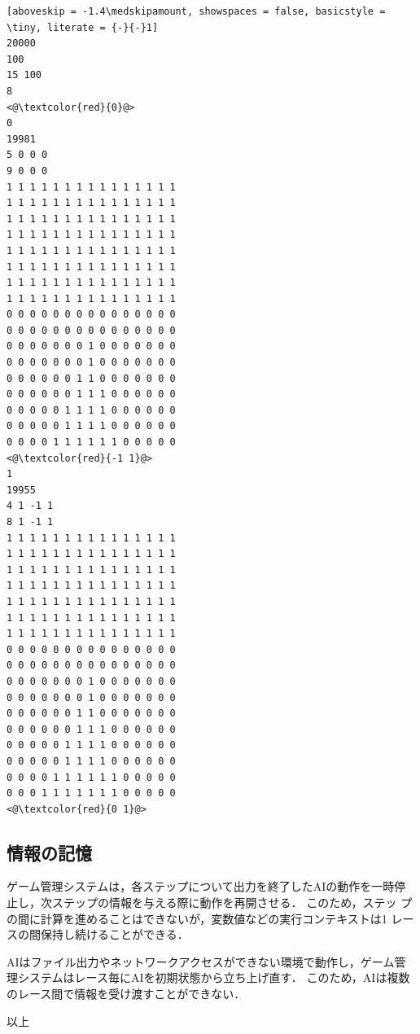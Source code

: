 \documentclass[11pt]{jarticle}
\begin{document}
\begin{minipage}[t]{.3\textwidth}
\begin{lstlisting}[aboveskip = -1.4\medskipamount, showspaces = false, basicstyle = \tiny, literate = {-}{-}1]
20000
100
15 100
8
<@\textcolor{red}{0}@>
0
19981
5 0 0 0
9 0 0 0
1 1 1 1 1 1 1 1 1 1 1 1 1 1 1
1 1 1 1 1 1 1 1 1 1 1 1 1 1 1
1 1 1 1 1 1 1 1 1 1 1 1 1 1 1
1 1 1 1 1 1 1 1 1 1 1 1 1 1 1
1 1 1 1 1 1 1 1 1 1 1 1 1 1 1
1 1 1 1 1 1 1 1 1 1 1 1 1 1 1
1 1 1 1 1 1 1 1 1 1 1 1 1 1 1
1 1 1 1 1 1 1 1 1 1 1 1 1 1 1
0 0 0 0 0 0 0 0 0 0 0 0 0 0 0
0 0 0 0 0 0 0 0 0 0 0 0 0 0 0
0 0 0 0 0 0 0 1 0 0 0 0 0 0 0
0 0 0 0 0 0 0 1 0 0 0 0 0 0 0
0 0 0 0 0 0 1 1 0 0 0 0 0 0 0
0 0 0 0 0 0 1 1 1 0 0 0 0 0 0
0 0 0 0 0 1 1 1 1 0 0 0 0 0 0
0 0 0 0 0 1 1 1 1 0 0 0 0 0 0
0 0 0 0 1 1 1 1 1 1 0 0 0 0 0
<@\textcolor{red}{-1 1}@>
1
19955
4 1 -1 1
8 1 -1 1
1 1 1 1 1 1 1 1 1 1 1 1 1 1 1
1 1 1 1 1 1 1 1 1 1 1 1 1 1 1
1 1 1 1 1 1 1 1 1 1 1 1 1 1 1
1 1 1 1 1 1 1 1 1 1 1 1 1 1 1
1 1 1 1 1 1 1 1 1 1 1 1 1 1 1
1 1 1 1 1 1 1 1 1 1 1 1 1 1 1
1 1 1 1 1 1 1 1 1 1 1 1 1 1 1
0 0 0 0 0 0 0 0 0 0 0 0 0 0 0
0 0 0 0 0 0 0 0 0 0 0 0 0 0 0
0 0 0 0 0 0 0 1 0 0 0 0 0 0 0
0 0 0 0 0 0 0 1 0 0 0 0 0 0 0
0 0 0 0 0 0 1 1 0 0 0 0 0 0 0
0 0 0 0 0 0 1 1 1 0 0 0 0 0 0
0 0 0 0 0 1 1 1 1 0 0 0 0 0 0
0 0 0 0 0 1 1 1 1 0 0 0 0 0 0
0 0 0 0 1 1 1 1 1 1 0 0 0 0 0
0 0 0 1 1 1 1 1 1 1 0 0 0 0 0
<@\textcolor{red}{0 1}@>
\end{lstlisting}
\end{minipage}

\subsection{情報の記憶}
ゲーム管理システムは，各ステップについて出力を終了したAIの動作を一時停
止し，次ステップの情報を与える際に動作を再開させる．  このため，ステッ
プの間に計算を進めることはできないが，変数値などの実行コンテキストは1
レースの間保持し続けることができる．

AIはファイル出力やネットワークアクセスができない環境で動作し，ゲーム管
理システムはレース毎にAIを初期状態から立ち上げ直す． このため，AIは複数
のレース間で情報を受け渡すことができない．

\begin{flushright}
以上
\end{flushright}
\end{document}

